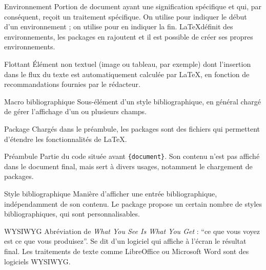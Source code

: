 \begin{glossaire}
\item[Environnement] Portion de document ayant une signification spécifique et qui, par conséquent, reçoit un traitement spécifique. On utilise  pour indiquer le début d'un environnement ; on utilise  pour en indiquer la fin. \LaTeX définit des environnements, les packages en rajoutent et il est possible de créer ses propres environnements.

\item[Flottant] Élément non textuel (image ou tableau, par exemple) dont l'insertion dans le flux du texte est automatiquement calculée par \LaTeX, en fonction de recommandations fournies par le rédacteur.

\item[Macro bibliographique] Sous-élément d'un style bibliographique, en général chargé de gérer l'affichage d'un ou plusieurs champs.

\item[Package] Chargés dans le préambule, les packages sont des fichiers qui permettent d'étendre les fonctionnalités  de \LaTeX.

\item[Préambule] Partie du code  située avant \verb|{document}|. Son contenu n'est pas affiché dans le document final, mais sert à divers usages, notamment le chargement de packages.

\item[Style bibliographique] Manière d'afficher une entrée bibliographique, indépendamment de son contenu. Le package  propose un certain nombre de styles bibliographiques, qui sont personnalisables. 

\item[WYSIWYG] Abréviation de \textenglish{\emph{What You See Is What You Get}} : \enquote{ce que vous voyez est ce que vous produisez}. Se dit d'un logiciel qui affiche à l'écran le résultat final. Les traitements de texte comme LibreOffice ou Microsoft Word sont des logiciels WYSIWYG.
\end{glossaire}
